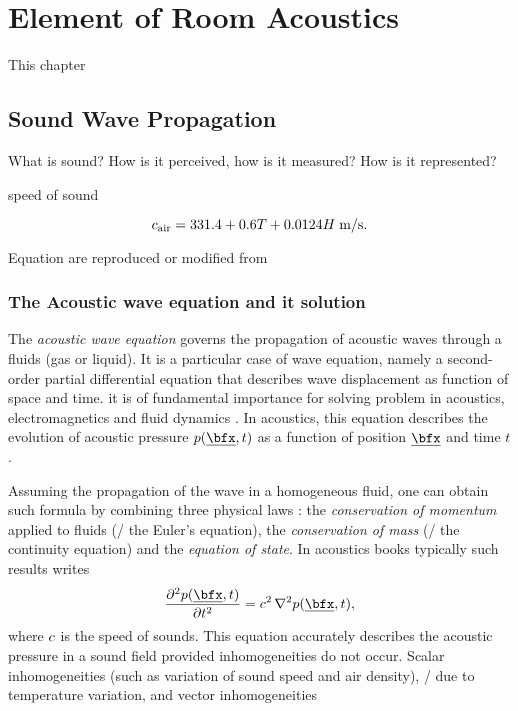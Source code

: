 \chapter{Element of Room Acoustics}\label{chap:acoustics}

 This chapter

\section{Sound Wave Propagation}
What is sound? How is it perceived, how is it measured? How is it represented?

speed of sound

\begin{equation}
    c_\text{air} =  331.4 + 0.6T + 0.0124H \; \text{m/s}
    .
\end{equation}

Equation are reproduced or modified from \cite{Kuttruff2009room, Marczuk2006modelling, Habets2010generator}

\subsection{The Acoustic wave equation and it solution}
\label{subsec:acoustics:waveq}
The \textit{acoustic wave equation} governs the propagation of acoustic waves through a fluids (gas or liquid).
It is a particular case of wave equation, namely a second-order partial differential equation that describes wave displacement as function of space and time.
it is of fundamental importance for solving problem in acoustics, electromagnetics and fluid dynamics
.
In acoustics, this equation describes the evolution of acoustic pressure $\pressure(\positionMicrophone, t)$
as a function of position $\positionMicrophone$ and time $t$.

Assuming the propagation of the wave in a homogeneous fluid, one can obtain such formula by combining three physical laws :
the \textit{conservation of momentum} applied to fluids (\aka/ the Euler's equation),
the \textit{conservation of mass} (\aka/ the continuity equation) and
the \textit{equation of state}.
In acoustics books typically such results writes
\begin{equation}
    \label{eq:acoustics:wave}
    \kpderiv[2]{\pressure(\positionMicrophone, t)}{t} = \speedOfSound^2 \knabla^2 \pressure(\positionMicrophone, t)
    ,
\end{equation}
where $c$ is the speed of sounds.
This equation accurately describes the acoustic pressure in a sound field provided inhomogeneities do not occur.
Scalar inhomogeneities (such as variation of sound speed and air density), \eg/ due to temperature variation, and
vector inhomogeneities

